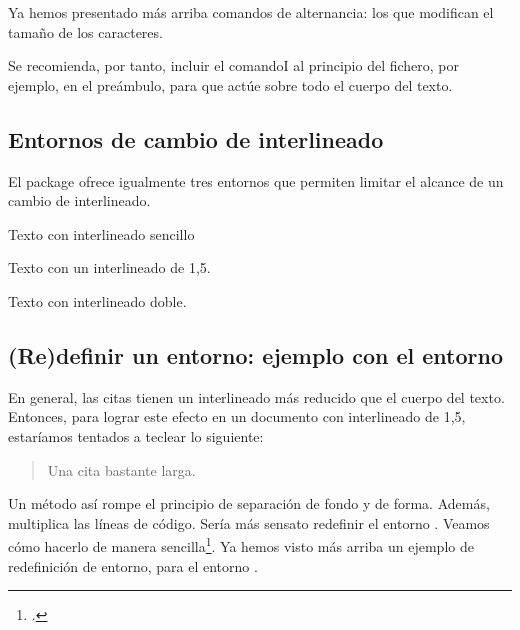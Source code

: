 Ya hemos presentado más arriba comandos de alternancia: los que modifican el tamaño de los caracteres.

Se recomienda, por tanto, incluir el comandoI  al principio del fichero, por ejemplo, en el preámbulo, para que actúe sobre todo el cuerpo del texto.

\subsection{Entornos de cambio de interlineado}

El package  ofrece igualmente tres entornos que permiten limitar el alcance de un cambio de interlineado. 

\begin{latexcode}
\begin{singlespace}
Texto con interlineado sencillo
\end{singlespace}
\begin{onehalfspace}
Texto con un interlineado de 1,5.
\end{onehalfspace}
\begin{doublespace}
Texto con interlineado doble.
\end{doublespace}
\end{latexcode}

\subsection[Redefinir un entorno: quotation]{(Re)definir un entorno: ejemplo con el entorno }

En general, las citas tienen un interlineado más reducido que el cuerpo del texto. Entonces, para lograr este efecto en un documento con interlineado de 1,5, estaríamos tentados a teclear lo siguiente:

\begin{latexcode}
\begin{singlespace}
\begin{quotation}
Una cita bastante larga.
\end{quotation}
\end{singlespace}
\end{latexcode}

Un método así rompe el principio de separación de fondo y de forma. Además, multiplica las líneas de código. Sería más sensato redefinir el entorno . Veamos cómo hacerlo de manera sencilla\footcite[Nos hemos basado en la clase  :][]{bredele}. Ya hemos visto más arriba un ejemplo de redefinición de entorno, para el entorno . 

